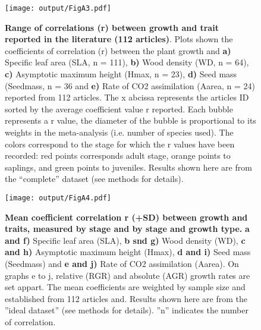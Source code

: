 \documentclass[a4paper,11pt]{article}
\begin{document}
\begin{appendices}
\begin{figure}[h!]
\centering
\texttt{[image: output/FigA3.pdf]}
\caption{\textbf{Range of correlations (r) between
growth and trait reported in the literature (112 articles)}. Plots shown the coefficients of correlation (r)
between the plant growth and \textbf{a)} Specific leaf area (SLA, n =
111), \textbf{b)} Wood density (WD, n = 64), \textbf{c)} Asymptotic
maximum height (Hmax, n = 23), \textbf{d)} Seed mass (Seedmass, n = 36 and
\textbf{e)} Rate of CO2 assimilation (Aarea, n = 24) reported from 112
articles. The x abcissa represents the articles ID sorted by the average coefficient value r reported. Each bubble represents a r value, the diameter of the bubble is proportional to its weights in the meta-analysis (i.e. number of species used). The colors correspond to the stage for which the r values have been recorded: red points corresponds adult stage, orange points to saplings, and green points to juveniles. Results shown here are from the ``complete'' dataset (see methods for details). }
\label{fig:figA3}
\end{figure}

\begin{figure}[h!]
\centering
\texttt{[image: output/FigA4.pdf]}
\caption{\textbf{Mean coefficient correlation r (+SD) between growth and traits, measured by stage and by stage and growth type.} \textbf{a and f)} Specific leaf area (SLA), \textbf{b snd g)} Wood density (WD), \textbf{c and h)} Asymptotic maximum height (Hmax), \textbf{d and i)} Seed mass (Seedmass) and \textbf{e and j)} Rate of CO2 assimilation (Aarea). On graphs e to j, relative (RGR) and absolute (AGR) growth rates are set appart. The mean coefficients are weighted by sample size and established from 112 articles and. Results shown here are from the ''ideal dataset'' (see methods for details). ''n'' indicates the number of correlation.}
\label{fig:figA4}
\end{figure}


\end{appendices}
\end{document}
